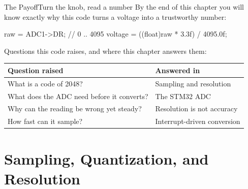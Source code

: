 \documentclass[9pt,aspectratio=169,xcolor=table]{beamer}
\begin{document}
{\beamerextras
\begin{frame}[fragile]{The Payoff}{Turn the knob, read a number}
    \leavevmode
    By the end of this chapter you will know exactly why this code turns a voltage into a trustworthy number:

    \vspace{2mm}
    \begin{center}
    \begin{minipage}{.9\textwidth}
\begin{cc}[basicstyle=\ttfamily\small]
raw     = ADC1->DR;                    // 0 .. 4095
voltage = ((float)raw * 3.3f) / 4095.0f;
\end{cc}
    \end{minipage}
    \end{center}

    \vspace{2mm}
    {\small Questions this code raises, and where this chapter answers them:}

    \vspace{1mm}
    \begin{center}
    {\small
    \striped
    \begin{tabular}{@{}l R{.52\textwidth}@{}}
        \toprule
        \textbf{Question raised} & \textbf{Answered in} \\
        \midrule
        What is a code of 2048? & Sampling and resolution \\
        What does the ADC need before it converts? & The STM32 ADC \\
        Why can the reading be wrong yet steady? & Resolution is not accuracy \\
        How fast can it sample? & Interrupt-driven conversion \\
        \bottomrule
    \end{tabular}}
    \end{center}
\end{frame}
}


\section{Sampling, Quantization, and Resolution}
\end{document}
